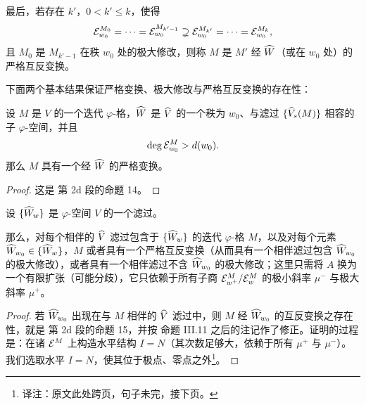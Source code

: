 最后，若存在 $k'$，$0<k'\le k$，使得
\[ \mathcal{E}_{w_0}^{M_0}=\cdots=\mathcal{E}_{w_0}^{M_{k'-1}}\supsetneq\mathcal{E}_{w_0}^{M_{k'}}=\cdots=\mathcal{E}_{w_0}^{M_k}, \]
且 $M_0$ 是 $M_{k'-1}$ 在秩 $w_0$ 处的极大修改，则称 $M$ 是 $M'$ 经 $\widehat W$（或在 $w_0$ 处）的严格互反变换。

下面两个基本结果保证严格变换、极大修改与严格互反变换的存在性：

\begin{proposition*}
设 $M$ 是 $V$ 的一个迭代 $\varphi$-格，$\widehat W$ 是 $\widehat V$ 的一个秩为 $w_0$、与滤过 $\{\widehat V_s(M)\}$ 相容的子 $\varphi$-空间，并且
\[ \deg\mathcal{E}_{w_0}^M>d(w_0). \]
那么 $M$ 具有一个经 $\widehat W$ 的严格变换。
\end{proposition*}

\begin{proof}
这是 \cite{lafforgue98} 第 2d 段的命题 14。
\end{proof}

\begin{proposition*}
设 $\{\widehat W_w\}$ 是 $\varphi$-空间 $V$ 的一个滤过。

那么，对每个相伴的 $\widehat V$ 滤过包含于 $\{\widehat W_w\}$ 的迭代 $\varphi$-格 $M$，以及对每个元素 $\widehat W_{w_0}\in\{\widehat W_w\}$，$M$ 或者具有一个严格互反变换（从而具有一个相伴滤过包含 $\widehat W_{w_0}$ 的极大修改），或者具有一个相伴滤过不含 $\widehat W_{w_0}$ 的极大修改；这里只需将 $A$ 换为一个有限扩张（可能分歧），它只依赖于所有子商 $\mathcal{E}_{w^{+}}^M/\mathcal{E}_w^M$ 的极小斜率 $\mu^{-}$ 与极大斜率 $\mu^{+}$。
\end{proposition*}

\begin{proof}
若 $\widehat W_{w_0}$ 出现在与 $M$ 相伴的 $\widehat V$ 滤过中，则 $M$ 经 $\widehat W_{w_0}$ 的互反变换之存在性，就是 \cite{lafforgue98} 第 2d 段的命题 15，并按 \cite{lafforgue02} 命题 III.11 之后的注记作了修正。证明的过程是：在诸 $\mathcal{E}^M$ 上构造水平结构 $I=N$（其次数足够大，依赖于所有 $\mu^{+}$ 与 $\mu^{-}$）。我们选取水平 $I=N$，使其位于极点、零点之外\footnote{译注：原文此处跨页，句子未完，接下页。}。
\end{proof}
